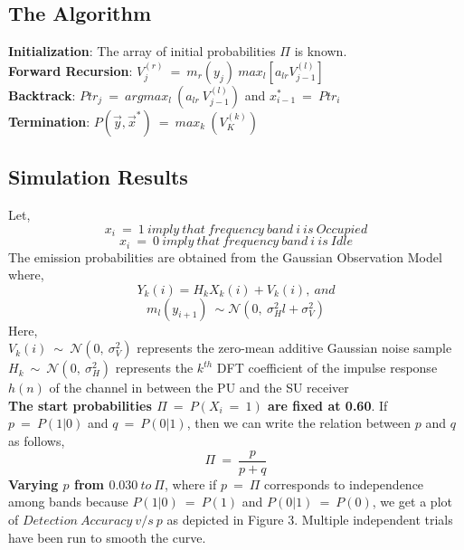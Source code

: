 \documentclass[12pt, draftcls, onecolumn]{IEEEtran}
\begin{document}
\subsection{The Algorithm}
\begin{flushleft}
\textbf{Initialization}: The array of initial probabilities $\Pi$ is known.
\\\textbf{Forward Recursion}: $V_j^{(r)}\ =\ m_r(y_j)\ max_{l}[a_{lr}V_{j-1}^{(l)}]$
\\\textbf{Backtrack}: $Ptr_j\ =\ argmax_l\ (a_{lr}\ V_{j-1}^{(l)})$ and $x_{i-1}^*\ =\ Ptr_{i}$
\\\textbf{Termination}: $P(\vec{y},\vec{x}^*)\ =\ max_k\ (V_K^{(k)})$
\end{flushleft}
\subsection{Simulation Results}
Let,
\[x_i\ =\ 1\ imply\ that\ frequency\ band\ i\ is\ Occupied\]
\[x_i\ =\ 0\ imply\ that\ frequency\ band\ i\ is\ Idle\]
The emission probabilities are obtained from the Gaussian Observation Model where,
\[Y_k(i) = H_kX_k(i) + V_k(i),\ and\]
\[m_l(y_{i+1})\ \sim \mathcal{N}(0,\ \sigma_H^2l+\sigma_V^2)\]
Here,
\\$V_k(i)\ \sim\ \mathcal{N}(0,\ \sigma_V^2)$ represents the zero-mean additive Gaussian noise sample
\\$H_k\ \sim\ \mathcal{N}(0,\ \sigma_H^2)$ represents the $k^{th}$ DFT coefficient of the impulse response $h(n)$ of the channel in between the PU and the SU receiver
\\\textbf{The start probabilities $\Pi\ =\ P(X_i\ =\ 1)$ are fixed at 0.60}.
If $p\ =\ P(1|0)$ and $q\ =\ P(0|1)$, then we can write the relation between $p$ and $q$ as follows,
\[\Pi\ =\ \frac{p}{p+q}\]
\textbf{Varying $p$ from $0.030\ to\ \Pi$}, where if $p\ =\ \Pi$ corresponds to independence among bands because $P(1|0)\ =\ P(1)$ and $P(0|1)\ =\ P(0)$, we get a plot of $Detection\ Accuracy\ v/s\ p$ as depicted in Figure 3. Multiple independent trials have been run to smooth the curve.
\end{document}
